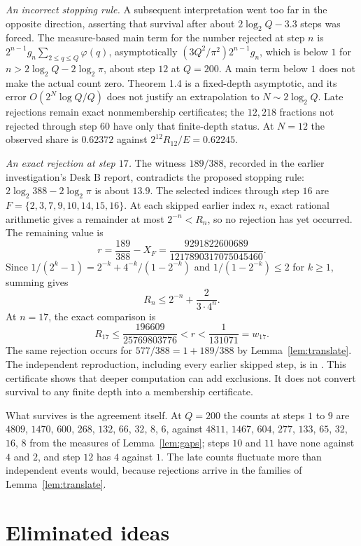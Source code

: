 \documentclass[11pt]{article}
\begin{document}
\emph{An incorrect stopping rule.}  A subsequent interpretation went too far
in the opposite direction, asserting that survival after about $2\log_2Q-3.3$
steps was forced.  The measure-based main term for the number rejected at step $n$ is
$2^{n-1}g_n\sum_{2\le q\le Q}\varphi(q)$, asymptotically
$(3Q^2/\pi^2)2^{n-1}g_n$, which is below $1$ for $n>2\log_2Q-2\log_2\pi$, about
step $12$ at $Q=200$.  A main term below $1$ does not make the actual count
zero.  Theorem 1.4 is a fixed-depth asymptotic, and its error
$O(2^N\log Q/Q)$ does not justify an extrapolation to $N\sim2\log_2Q$.
Late rejections remain exact nonmembership certificates; the $12{,}218$
fractions not rejected through step $60$ have only that finite-depth status.
At $N=12$ the observed share is $0.62372$ against
$2^{12}R_{12}/E=0.62245$.

\emph{An exact rejection at step $17$.}  The witness $189/388$, recorded in the
earlier investigation's Desk B report, contradicts the proposed stopping rule:
$2\log_2 388-2\log_2\pi$ is about $13.9$.  The selected indices through step $16$
are $F=\{2,3,7,9,10,14,15,16\}$.  At each skipped earlier index $n$, exact
rational arithmetic gives a remainder at most $2^{-n}<R_n$, so no rejection
has yet occurred.  The remaining value is
\[
 r=\frac{189}{388}-X_F
  =\frac{9291822600689}{1217890317075045460}.
\]
Since $1/(2^k-1)=2^{-k}+4^{-k}/(1-2^{-k})$ and
$1/(1-2^{-k})\le2$ for $k\ge1$, summing gives
\[
 R_n\le2^{-n}+\frac{2}{3\cdot4^n}.
\]
At $n=17$, the exact comparison is
\[
 R_{17}\le\frac{196609}{25769803776}<r<\frac1{131071}=w_{17}.
\]
The same rejection occurs for $577/388=1+189/388$ by
Lemma~\ref{lem:translate}.  The independent reproduction, including every
earlier skipped step, is in
.
This certificate shows that deeper computation can add exclusions.  It does
not convert survival to any finite depth into a membership certificate.

What survives is the agreement itself.  At $Q=200$ the counts at steps $1$ to
$9$ are $4809$, $1470$, $600$, $268$, $132$, $66$, $32$, $8$, $6$, against
$4811$, $1467$, $604$, $277$, $133$, $65$, $32$, $16$, $8$ from the measures of
Lemma~\ref{lem:gaps}; steps $10$ and $11$ have none against $4$ and $2$, and
step $12$ has $4$ against $1$.  The late counts fluctuate more than independent
events would, because rejections arrive in the families of
Lemma~\ref{lem:translate}.

\section{Eliminated ideas}\label{sec:eliminated}
\end{document}
